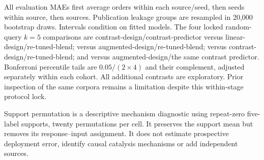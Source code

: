 All evaluation MAEs first average orders within each source/seed, then seeds within source, then sources. Publication leakage groups are resampled in 20,000 bootstrap draws. Intervals condition on fitted models. The four locked random-query $k=5$ comparisons are contrast-design/contrast-predictor versus linear-design/re-tuned-blend; versus augmented-design/re-tuned-blend; versus contrast-design/re-tuned-blend; and versus augmented-design/the same contrast predictor. Bonferroni percentile tails are $0.05/(2\times4)$ and their complement, adjusted separately within each cohort. All additional contrasts are exploratory. Prior inspection of the same corpora remains a limitation despite this within-stage protocol lock.

Support permutation is a descriptive mechanism diagnostic using repeat-zero five-label supports, twenty permutations per cell. It preserves the support mean but removes its response--input assignment. It does not estimate prospective deployment error, identify causal catalysis mechanisms or add independent sources.
